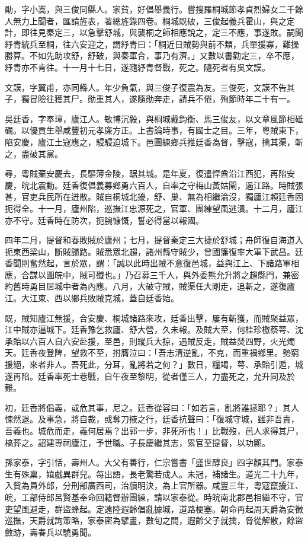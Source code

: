 \begin{pinyinscope}
勛，字小嵩，與三俊同縣人。家貧，好倡舉義行。嘗搜羅桐城節孝貞烈婦女二千餘人無力上聞者，匯請旌表，著總旌錄四卷。桐城既破，三俊起義兵霍山，與之定計，即往見秦定三，以急擊舒城，與襲桐之師相應說之，定三不應，事遂敗。嗣聞紓青統兵至桐，往六安迎之，謂紓青曰：「桐近日賊勢與前不類，兵單援寡，難操勝算。不如先助攻舒，舒破，與秦軍合，事乃有濟。」又數以書勸定三，卒不應，紓青亦不肯往。十一月十七日，遂隨紓青督戰，死之。隨死者有吳文謨。

文謨，字翼甫，亦同縣人。年少負氣，與三俊子復震為友。三俊死，文謨不告其子，獨冒險往獲其尸。勛重其人，遂隨勛奔走，請兵不倦，殉節時年二十有一。

吳廷香，字奉璋，廬江人。敏博沉毅，與桐城戴鈞衡、馬三俊友，以文章風節相砥礪。以優貢生舉咸豐初元孝廉方正。上書論時事，有國士之目。三年，粵賊東下，陷安慶，廬江土寇應之，駸駸迫城下。邑團練鄉兵推廷香為督，擊寇，擒其渠，斬之，盡破其黨。

尋，粵賊棄安慶去，長驅薄金陵，踞其城。是年夏，復遣悍酋沿江西犯，再陷安慶，皖北震動。廷香復倡義募鄉勇六百人，自率之守梅山黃姑閘，遏江路。時賊張甚，官吏兵民所在迸散。賊自桐城北擾，舒、巢、無為相繼淪沒，獨廬江賴廷香固扼得全。十一月，廬州陷，巡撫江忠源死之，官軍、團練望風逃潰。十二月，廬江亦不守。廷香時在防次，扼腕慷慨，誓必得當以報國。

四年二月，提督和春敗賊於廬州；七月，提督秦定三大捷於舒城；舟師復自海道入扼東西梁山，斷賊歸路。賊悉眾北趨，諸州縣守賊少，曾國籓復率大軍下武昌。廷香聞則奮然起，言於眾，謂：「誠以此時出賊不意復邑城，益與江上、下諸路軍相應，合謀以圖皖中，賊可殲也。」乃召募三千人，與外委熊允升將之趨縣門，兼密約舊時勇目居城中者為內應。八月，大破守賊，賊渠任大剛走，追斬之，遂復廬江。大江東、西以鄉兵敗賊克城，蓋自廷香始。

既，賊知廬江無援，合安慶、桐城諸路來攻，廷香出擊，屢有斬獲，而賊聚益眾，江中賊亦逼城下。廷香豫乞救廬、舒大營，久未報。及賊大至，何桂珍檄蔡萼、沈承貽以六百人自六安赴援，至邑，則縱兵大掠，遇賊反走，賊益焚四野，火光燭天。廷香夜登陴，望救不至，拊膺泣曰：「吾志清逆亂，不克，而重禍鄉里。勢窮援絕，來者非人。吾死此，分耳，亂將若之何？」數日，糧竭，萼、承貽引遁，城遂再陷。廷香率死士巷戰，自午夜至黎明，從者僅三人，力盡死之，允升同及於難。

初，廷香將倡義，或危其事，尼之。廷香從容曰：「如若言，亂將誰拯耶？」其人悚然退。及事急，將自裁，或奪刀掖之行，廷香抗聲曰：「復城守城，雖非吾責，吾義也。城危而走，義何居焉？出郭一步，非死所也！」比戰歿，邑人求得其尸，槁葬之。詔建專祠廬江，予世職。子長慶繼其志，累官至提督，以功顯。

孫家泰，字引恬，壽州人。大父有善行，仁宗嘗書「盛世醇良」四字顏其門。家泰生有殊稟，嬉戲異群兒。每出語，長老驚若成人。未冠，補諸生。道光二十九年，入貲為員外郎，分刑部廣西司，治牘明決，為上官所器。咸豐三年，粵寇竄擾江、皖，工部侍郎呂賢基奉命回籍督辦團練，請以家泰從。時皖南北郡邑相繼不守，官吏望風避走，群盜蜂起。定遠陸遐齡倡亂據城，道路梗塞。朝命再起周天爵為安徽巡撫，天爵就詢策略，家泰密為擘畫，數旬之間，遐齡父子就擒，脅從解散，餘盜斂跡，壽春兵以驍勇聞。


\end{pinyinscope}
